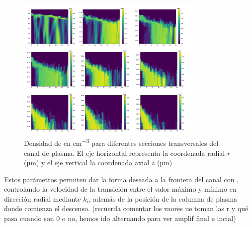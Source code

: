 \begin{figure}[htbp]
  \centering
  \includegraphics[width=0.8\textwidth]{Figuras/ch4_ionkr8.png}
  \caption{Densidad de  en \unit{cm^{-3}} para diferentes secciones transversales del canal de plasma. El eje horizontal representa la coordenada radial $r$ (\unit{µm}) y el eje vertical la coordenada axial $z$ (\unit{µm})}
  \label{fig:4.2}
\end{figure}

Estos parámetros permiten dar la forma deseada a la frontera del canal con , controlando la velocidad de la transición entre el valor máximo y mínimo en dirección radial mediante $k_{i}$, además de la posición de la columna de plasma donde comienza el descenso. (recuerda comentar los vaores ue toman las r y qué pasa cuando son 0 o no, hemos ido alternando para ver amplif final e incial)

%
%
%

